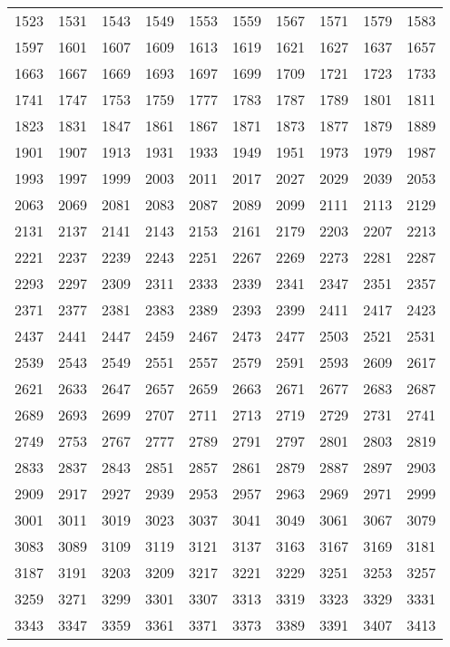 \documentclass[12pt]{article}
\begin{document}
\begin{tabular}{rrrrrrrrrr}
1523 & 1531 & 1543 & 1549 & 1553 & 1559 & 1567 & 1571 & 1579 & 1583 \\
1597 & 1601 & 1607 & 1609 & 1613 & 1619 & 1621 & 1627 & 1637 & 1657 \\
1663 & 1667 & 1669 & 1693 & 1697 & 1699 & 1709 & 1721 & 1723 & 1733 \\
1741 & 1747 & 1753 & 1759 & 1777 & 1783 & 1787 & 1789 & 1801 & 1811 \\
1823 & 1831 & 1847 & 1861 & 1867 & 1871 & 1873 & 1877 & 1879 & 1889 \\
1901 & 1907 & 1913 & 1931 & 1933 & 1949 & 1951 & 1973 & 1979 & 1987 \\
1993 & 1997 & 1999 & 2003 & 2011 & 2017 & 2027 & 2029 & 2039 & 2053 \\
2063 & 2069 & 2081 & 2083 & 2087 & 2089 & 2099 & 2111 & 2113 & 2129 \\
2131 & 2137 & 2141 & 2143 & 2153 & 2161 & 2179 & 2203 & 2207 & 2213 \\
2221 & 2237 & 2239 & 2243 & 2251 & 2267 & 2269 & 2273 & 2281 & 2287 \\
2293 & 2297 & 2309 & 2311 & 2333 & 2339 & 2341 & 2347 & 2351 & 2357 \\
2371 & 2377 & 2381 & 2383 & 2389 & 2393 & 2399 & 2411 & 2417 & 2423 \\
2437 & 2441 & 2447 & 2459 & 2467 & 2473 & 2477 & 2503 & 2521 & 2531 \\
2539 & 2543 & 2549 & 2551 & 2557 & 2579 & 2591 & 2593 & 2609 & 2617 \\
2621 & 2633 & 2647 & 2657 & 2659 & 2663 & 2671 & 2677 & 2683 & 2687 \\
2689 & 2693 & 2699 & 2707 & 2711 & 2713 & 2719 & 2729 & 2731 & 2741 \\
2749 & 2753 & 2767 & 2777 & 2789 & 2791 & 2797 & 2801 & 2803 & 2819 \\
2833 & 2837 & 2843 & 2851 & 2857 & 2861 & 2879 & 2887 & 2897 & 2903 \\
2909 & 2917 & 2927 & 2939 & 2953 & 2957 & 2963 & 2969 & 2971 & 2999 \\
3001 & 3011 & 3019 & 3023 & 3037 & 3041 & 3049 & 3061 & 3067 & 3079 \\
3083 & 3089 & 3109 & 3119 & 3121 & 3137 & 3163 & 3167 & 3169 & 3181 \\
3187 & 3191 & 3203 & 3209 & 3217 & 3221 & 3229 & 3251 & 3253 & 3257 \\
3259 & 3271 & 3299 & 3301 & 3307 & 3313 & 3319 & 3323 & 3329 & 3331 \\
3343 & 3347 & 3359 & 3361 & 3371 & 3373 & 3389 & 3391 & 3407 & 3413 \\

\end{tabular}
\end{document}

